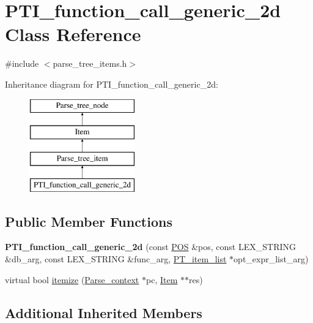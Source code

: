 \hypertarget{classPTI__function__call__generic__2d}{}\section{P\+T\+I\+\_\+function\+\_\+call\+\_\+generic\+\_\+2d Class Reference}
\label{classPTI__function__call__generic__2d}


{\ttfamily \#include $<$parse\+\_\+tree\+\_\+items.\+h$>$}

Inheritance diagram for P\+T\+I\+\_\+function\+\_\+call\+\_\+generic\+\_\+2d\+:\begin{figure}[H]
\begin{center}
\leavevmode
\includegraphics[height=4.000000cm]{classPTI__function__call__generic__2d}
\end{center}
\end{figure}
\subsection*{Public Member Functions}
\begin{DoxyCompactItemize}
\item 
\mbox{\label{classPTI__function__call__generic__2d_a67ea81a0535dcc9097c1399038f8d010}} 
{\bfseries P\+T\+I\+\_\+function\+\_\+call\+\_\+generic\+\_\+2d} (const \mbox{\hyperlink{structYYLTYPE}{P\+OS}} \&pos, const L\+E\+X\+\_\+\+S\+T\+R\+I\+NG \&db\+\_\+arg, const L\+E\+X\+\_\+\+S\+T\+R\+I\+NG \&func\+\_\+arg, \mbox{\hyperlink{classPT__item__list}{P\+T\+\_\+item\+\_\+list}} $\ast$opt\+\_\+expr\+\_\+list\+\_\+arg)
\item 
virtual bool \mbox{\hyperlink{classPTI__function__call__generic__2d_a8389488372c0fcd602892f942a9b73ed}{itemize}} (\mbox{\hyperlink{structParse__context}{Parse\+\_\+context}} $\ast$pc, \mbox{\hyperlink{classItem}{Item}} $\ast$$\ast$res)
\end{DoxyCompactItemize}
\subsection*{Additional Inherited Members}


